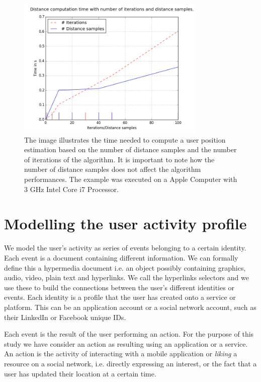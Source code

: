 \begin{figure}[t]
\centering
\includegraphics[width=90mm]{figures/figure_time.png}
\caption[Computational time needed to estimate a user position.]{The image illustrates the time needed to compute a user position estimation based on the number of distance samples and the number of iterations of the algorithm. It is important to note how the number of distance samples does not affect the algorithm performances. The example was executed on a Apple Computer with 3 GHz Intel Core i7 Processor.
\label{fig:comp_time}}
\end{figure}

\section{Modelling the user activity profile}
\label{sec:activity-profile}
\noindent
We model the user's activity as series of events belonging to a certain identity. Each event is a document containing different information. We can formally define this a hypermedia document i.e. an object possibly containing graphics, audio, video, plain text and hyperlinks. We call the hyperlinks selectors and we use these to build the connections between the user's different identities or events. Each identity is a profile that the user has created onto a service or platform. This can be an application account or a social network account, such as their LinkedIn or Facebook unique IDs.

Each event is the result of the user performing an action. For the purpose of this study we have consider an action as resulting using an application or a service. An action is the activity of interacting with a mobile application or \emph{liking} a resource on a social network, i.e. directly expressing an interest, or the fact that a user has updated their location at a certain time.

